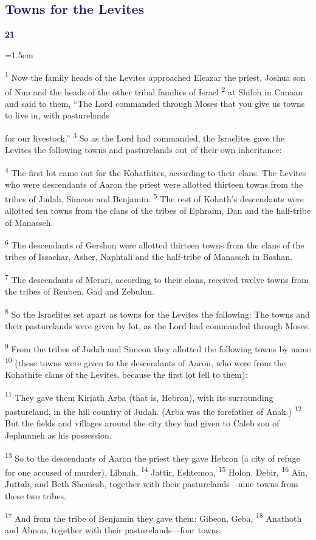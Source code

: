 \documentclass[12pt,twoside]{article}
\newcommand{\vs}[1]{\textsuperscript{#1}}
\newcommand{\chapterWithBigIndent}[2]{%
  \noindent
  \begin{minipage}[t]{1cm}
    \vspace{-0.4\baselineskip}
    {\textcolor{MidnightBlue}{\fontsize{40pt}{48pt}\selectfont \textbf{#1}}}
  \end{minipage}%
  \hspace{0.9cm}%
  \begin{minipage}[t]{\dimexpr\linewidth - 1.5cm - 0.3cm\relax}
    \hangindent=1.5em
    \hangafter=3
    #2
    \vspace{0.05cm}
  \end{minipage}
}
\begin{document}
\subsection*{\textcolor{MidnightBlue}{\textbf{Towns for the Levites}}}

\chapterWithBigIndent{21}{
  \vs{1} Now the family heads of the Levites approached Eleazar the priest, Joshua son of Nun and the heads of the other tribal families of Israel
  \vs{2} at Shiloh in Canaan and said to them, ``The Lord commanded through Moses that you give us towns to live in, with pasturelands\vspace{-0.4cm}
}
\noindent for our livestock.''
\vs{3} So as the Lord had commanded, the Israelites gave the Levites the following towns and pasturelands out of their own inheritance:

\vs{4} The first lot came out for the Kohathites, according to their clans. The Levites who were descendants of Aaron the priest were allotted thirteen towns from the tribes of Judah, Simeon and Benjamin.
\vs{5} The rest of Kohath's descendants were allotted ten towns from the clans of the tribes of Ephraim, Dan and the half-tribe of Manasseh.

\vs{6} The descendants of Gershon were allotted thirteen towns from the clans of the tribes of Issachar, Asher, Naphtali and the half-tribe of Manasseh in Bashan.

\vs{7} The descendants of Merari, according to their clans, received twelve towns from the tribes of Reuben, Gad and Zebulun.

\vs{8} So the Israelites set apart as towns for the Levites the following: The towns and their pasturelands were given by lot, as the Lord had commanded through Moses.\vspace{0.4cm}

\noindent \vs{9} From the tribes of Judah and Simeon they allotted the following towns by name
\vs{10} (these towns were given to the descendants of Aaron, who were from the Kohathite clans of the Levites, because the first lot fell to them):

\begin{adjustwidth}{0.5cm}{0cm}
  \hspace{0.5cm}\vs{11} They gave them Kiriath Arba (that is, Hebron), with its surrounding pastureland, in the hill country of Judah. (Arba was the forefather of Anak.)
  \vs{12} But the fields and villages around the city they had given to Caleb son of Jephunneh as his possession.

  \vs{13} So to the descendants of Aaron the priest they gave Hebron (a city of refuge for one accused of murder), Libnah,
  \vs{14} Jattir, Eshtemoa,
  \vs{15} Holon, Debir,
  \vs{16} Ain, Juttah, and Beth Shemesh, together with their pasturelands---nine towns from these two tribes.

  \vs{17} And from the tribe of Benjamin they gave them: Gibeon, Geba,
  \vs{18} Anathoth and Almon, together with their pasturelands---four towns.
\end{adjustwidth}
\end{document}
